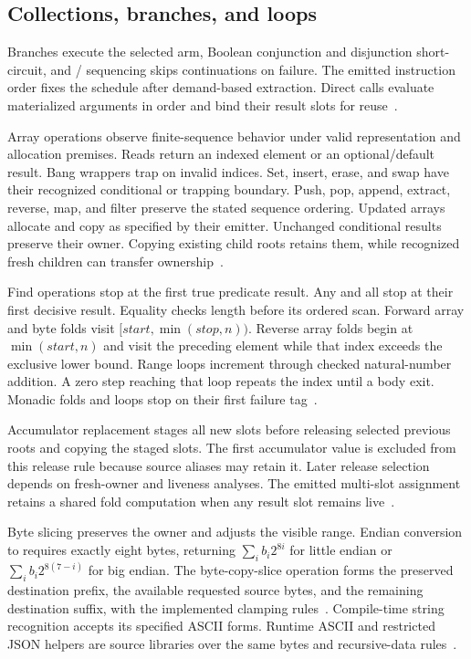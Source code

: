 \documentclass[11pt]{article}
\newcommand{\code}[1]{\texttt{\seqsplit{#1}}}
\begin{document}
\subsection{Collections, branches, and loops}

Branches execute the selected arm, Boolean conjunction and disjunction short-circuit, and \code{Option}/\code{Except} sequencing skips continuations on failure.  The emitted instruction order fixes the schedule after demand-based extraction.  Direct calls evaluate materialized arguments in order and bind their result slots for reuse~\cite{extract,binary}.

Array operations observe finite-sequence behavior under valid representation and allocation premises.  Reads return an indexed element or an optional/default result.  Bang wrappers trap on invalid indices.  Set, insert, erase, and swap have their recognized conditional or trapping boundary.  Push, pop, append, extract, reverse, map, and filter preserve the stated sequence ordering.  Updated arrays allocate and copy as specified by their emitter.  Unchanged conditional results preserve their owner.  Copying existing child roots retains them, while recognized fresh children can transfer ownership~\cite{values,binary}.

Find operations stop at the first true predicate result.  Any and all stop at their first decisive result.  Equality checks length before its ordered scan.  Forward array and byte folds visit $[\mathit{start},\min(\mathit{stop},n))$.  Reverse array folds begin at $\min(\mathit{start},n)$ and visit the preceding element while that index exceeds the exclusive lower bound.  Range loops increment through checked natural-number addition.  A zero step reaching that loop repeats the index until a body exit.  Monadic folds and loops stop on their first failure tag~\cite{binary}.

Accumulator replacement stages all new slots before releasing selected previous roots and copying the staged slots.  The first accumulator value is excluded from this release rule because source aliases may retain it.  Later release selection depends on fresh-owner and liveness analyses.  The emitted multi-slot assignment retains a shared fold computation when any result slot remains live~\cite{values,binary}.

Byte slicing preserves the owner and adjusts the visible range.  Endian conversion to \code{UInt64} requires exactly eight bytes, returning $\sum_i b_i2^{8i}$ for little endian or $\sum_i b_i2^{8(7-i)}$ for big endian.  The byte-copy-slice operation forms the preserved destination prefix, the available requested source bytes, and the remaining destination suffix, with the implemented clamping rules~\cite{values,binary}.  Compile-time string recognition accepts its specified ASCII forms.  Runtime ASCII and restricted JSON helpers are source libraries over the same bytes and recursive-data rules~\cite{specification}.
\end{document}
